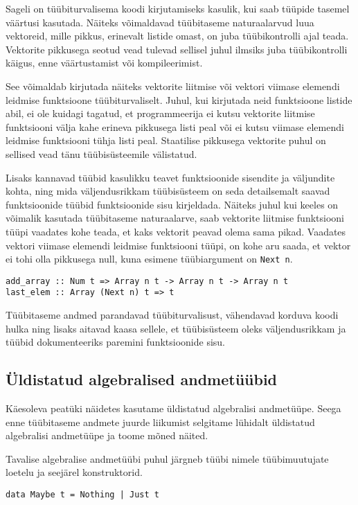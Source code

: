 \documentclass[12pt]{article}
\begin{document}
    Sageli on tüübiturvalisema koodi kirjutamiseks kasulik, kui saab tüüpide tasemel väärtusi kasutada. Näiteks võimaldavad tüübitaseme naturaalarvud luua vektoreid, mille pikkus, erinevalt listide omast, on juba tüübikontrolli ajal teada. Vektorite pikkusega seotud vead tulevad sellisel juhul ilmsiks juba tüübikontrolli käigus, enne väärtustamist või kompileerimist.

    See võimaldab kirjutada näiteks vektorite liitmise või vektori viimase elemendi leidmise funktsioone tüübiturvaliselt. Juhul, kui kirjutada neid funktsioone listide abil, ei ole kuidagi tagatud, et programmeerija ei kutsu vektorite liitmise funktsiooni välja kahe erineva pikkusega listi peal või ei kutsu viimase elemendi leidmise funktsiooni tühja listi peal. Staatilise pikkusega vektorite puhul on sellised vead tänu tüübisüsteemile välistatud.

    Lisaks kannavad tüübid kasulikku teavet funktsioonide sisendite ja väljundite kohta, ning mida väljendusrikkam tüübisüsteem on seda detailsemalt saavad funktsioonide tüübid funktsioonide sisu kirjeldada. Näiteks juhul kui keeles on võimalik kasutada tüübitaseme naturaalarve, saab vektorite liitmise funktsiooni tüüpi vaadates kohe teada, et kaks vektorit peavad olema sama pikad. Vaadates vektori viimase elemendi leidmise funktsiooni tüüpi, on kohe aru saada, et vektor ei tohi olla pikkusega null, kuna esimene tüübiargument on \verb!Next n!.

    \begin{verbatim}add_array :: Num t => Array n t -> Array n t -> Array n t
last_elem :: Array (Next n) t => t\end{verbatim}

    Tüübitaseme andmed parandavad tüübiturvalisust, vähendavad korduva koodi hulka ning lisaks aitavad kaasa sellele, et tüübisüsteem oleks väljendusrikkam ja tüübid dokumenteeriks paremini funktsioonide sisu.
    \subsection{Üldistatud algebralised andmetüübid}
      Käesoleva peatüki näidetes kasutame üldistatud algebralisi andmetüüpe. Seega enne tüübitaseme andmete juurde liikumist selgitame lühidalt üldistatud algebralisi andmetüüpe ja toome mõned näited.

      Tavalise algebralise andmetüübi puhul järgneb tüübi nimele tüübimuutujate loetelu ja seejärel konstruktorid.

      \begin{verbatim}data Maybe t = Nothing | Just t\end{verbatim}
\end{document}
